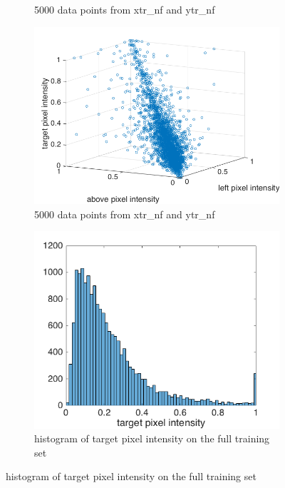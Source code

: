 \documentclass{article}
\begin{document}
\begin{enumerate}[label=(\alph*)]
\begin{figure}[t]
\begin{subfigure}{0.5\textwidth}
				 			\caption{5000 data points from xtr\_nf and ytr\_nf}
				 			\label{fig:p1-2-a_above_target}
				 		\end{subfigure}		
				 		\begin{subfigure}{0.5\textwidth}
				 			\includegraphics[width=\linewidth]{images/p1-2-a_closest_pixels.png}
				 			\caption{5000 data points from xtr\_nf and ytr\_nf}
				 			\label{fig:p1-2-a_closest_pixels}
				 		\end{subfigure} 
				 		\begin{subfigure}{0.5\textwidth}
				 			\includegraphics[width=\linewidth]{images/p1-2-a_target_hist.png}
				 			\caption{histogram of target pixel intensity on the full training set}

\end{subfigure}
\end{figure}
\end{enumerate}
\end{document}
